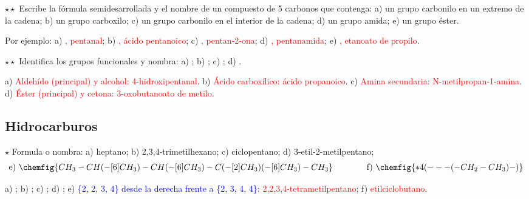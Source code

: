 \begin{exercise}
    \(\star\star\) Escribe la fórmula semidesarrollada y el nombre de un compuesto de 5 carbonos que contenga: a) un grupo
    carbonilo en un extremo de la cadena; b) un grupo carboxilo; c) un grupo carbonilo en el interior de la cadena; d) un grupo
    amida; e) un grupo éster.
    \begin{solu}
        Por ejemplo: a) \textcolor{red}{, pentanal}; b) \textcolor{red}{, ácido
        pentanoico}; c) \textcolor{red}{, pentan-2-ona}; d) \textcolor{red}{,
        pentanamida}; e) \textcolor{red}{, etanoato de propilo}.
    \end{solu}
\end{exercise}

\begin{exercise}
    \(\star\star\) Identifica los grupos funcionales y nombra: a) ; b) ;
    c) ; d) .
    \begin{solu}
        a) \textcolor{red}{Aldehído (principal) y alcohol: 4-hidroxipentanal}. b) \textcolor{red}{Ácido carboxílico: ácido
        propanoico}. c) \textcolor{red}{Amina secundaria: N-metilpropan-1-amina}. d) \textcolor{red}{Éster (principal) y cetona:
        3-oxobutanoato de metilo}.
    \end{solu}
\end{exercise}

\subsection{Hidrocarburos}

\begin{exercise}
    \(\star\) Formula o nombra: a) heptano; b) 2,3,4-trimetilhexano; c) ciclopentano; d) 3-etil-2-metilpentano;
    \[ \text{e)}\ \chemfig{CH_3-CH(-[6]CH_3)-CH(-[6]CH_3)-C(-[2]CH_3)(-[6]CH_3)-CH_3} \qquad\qquad
       \text{f)}\ \chemfig{*4(---(-CH_2-CH_3)-)} \]
    \begin{solu}
        a) \textcolor{red}{}; b) \textcolor{red}{};
        c) \textcolor{red}{}; d) \textcolor{red}{};
        e) \textcolor{blue}{\{2, 2, 3, 4\} desde la derecha frente a \{2, 3, 4, 4\}:} \textcolor{red}{2,2,3,4-tetrametilpentano};
        f) \textcolor{red}{etilciclobutano}.
    \end{solu}
\end{exercise}

